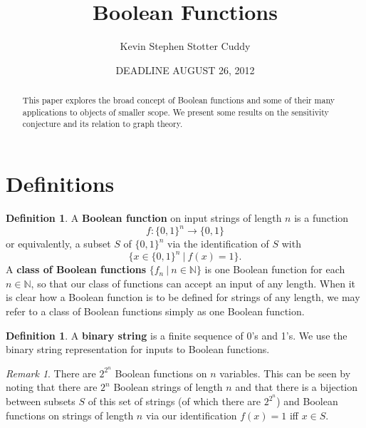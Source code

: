 \documentclass[psamsfonts]{amsart}
\title{Boolean Functions}
\author{Kevin Stephen Stotter Cuddy}
\date{DEADLINE AUGUST 26, 2012}
\theoremstyle{definition}
\newtheorem{defn}[thm]{Definition}
\theoremstyle{remark}
\newtheorem{rem}[thm]{Remark}
\numberwithin{equation}{section}
\begin{document}
\begin{abstract}

This paper explores the broad concept of Boolean functions and some of their many applications to objects of smaller scope.  We present some results on the sensitivity conjecture and its relation to graph theory.  


\end{abstract}

\maketitle



\section{Definitions}

\begin{defn}\label{booleanfunction}
A \textbf{Boolean function} on input strings of length $n$ is a function $$f: \{ 0, 1 \}^{n} \rightarrow \{ 0, 1 \}$$ or equivalently, a subset $S$ of $\{ 0, 1\}^{n}$ via the identification
 of $S$ with $$\{ x \in \{0, 1\}^{n} \: | \: f(x) = 1\}.$$  A \textbf{class of Boolean functions} $\{ f_{n} \:| \:n \in \mathbb{N} \}$ is one Boolean function for each $n \in \mathbb{N}$, so that 
our class of functions can accept an input of any length.  When it is clear how a Boolean function is to be defined for strings of any length, we may refer to a class of Boolean functions 
simply as one Boolean function.  
\end{defn}

\begin{defn}\label{binarystring}
A \textbf{binary string} is a finite sequence of 0's and 1's.  We use the binary string representation for inputs to Boolean functions.
\end{defn}

\begin{rem}\label{numberofBooleanfns}
There are $2^{2^{n}}$ Boolean functions on $n$ variables.  This can be seen by noting that there are $2^{n}$ Boolean strings of length $n$ and that there is 
a bijection between subsets $S$ of this set of strings (of which there are $2^{2^{n}}$) and Boolean functions on strings of length $n$ via our identification $f(x)=1$ iff $x \in S$.  
\end{rem}

\end{document}
